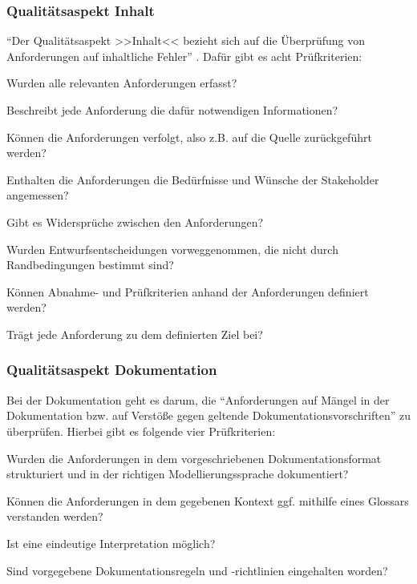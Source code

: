 \documentclass [12pt, a4paper, oneside, titlepage, ngerman]{article}
\begin{document}
\subsubsection{Qualitätsaspekt Inhalt}
"`Der Qualitätsaspekt >>Inhalt<< bezieht sich auf die Überprüfung von Anforderungen auf inhaltliche Fehler"' \cite[S.98]{PohlRupp2015}. Dafür gibt es acht Prüfkriterien\cite[vgl.][S.98]{PohlRupp2015}: 
\begin{description}[font=\itshape]\setlength\itemsep{0em}
\item[Vollständigkeit:] Wurden alle relevanten Anforderungen erfasst?
\item[Korrektheit:] Beschreibt jede Anforderung die dafür notwendigen Informationen?
\item[Verfolgbarkeit:] Können die Anforderungen verfolgt, also z.B. auf die Quelle zurückgeführt werden?
\item[Adäquatheit:] Enthalten die Anforderungen die Bedürfnisse und Wünsche der Stakeholder angemessen?
\item[Konsistenz:] Gibt es Widersprüche zwischen den Anforderungen?
\item[Vorzeitige Entwurfsentscheidungen:] Wurden Entwurfsentscheidungen vorweggenommen, die nicht durch Randbedingungen bestimmt sind?
\item[Überprüfbarkeit:] Können Abnahme- und Prüfkriterien anhand der Anforderungen definiert werden?
\item[Notwendigkeit:] Trägt jede Anforderung zu dem definierten Ziel bei?
\end{description}

\subsubsection{Qualitätsaspekt Dokumentation}
Bei der Dokumentation geht es darum, die "`Anforderungen auf Mängel in der Dokumentation bzw. auf Verstöße gegen geltende Dokumentationsvorschriften"'\cite[S.99]{PohlRupp2015} zu überprüfen. Hierbei gibt es folgende vier Prüfkriterien\cite[vgl.][S.99f.]{PohlRupp2015}:
\begin{description}[font=\itshape]\setlength\itemsep{0em}
\item[Konformität:] Wurden die Anforderungen in dem vorgeschriebenen Dokumentationsformat strukturiert und in der richtigen Modellierungssprache dokumentiert?
\item[Verständlichkeit:] Können die Anforderungen in dem gegebenen Kontext ggf. mithilfe eines Glossars verstanden werden?
\item[Eindeutigkeit:] Ist eine eindeutige Interpretation möglich?
\item[Konformität mit Dokumentationsregeln:] Sind vorgegebene Dokumentationsregeln und -richtlinien eingehalten worden?
\end{description}
\end{document}
